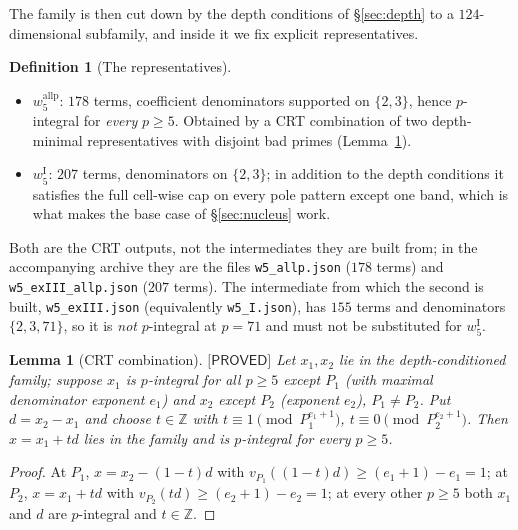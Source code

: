 \documentclass[11pt,reqno]{amsart}
\theoremstyle{plain}
\newtheorem{lemma}[theorem]{Lemma}
\theoremstyle{definition}
\newtheorem{definition}[theorem]{Definition}
\theoremstyle{remark}
\numberwithin{equation}{section}
\newcommand{\ZZ}{\mathbb{Z}}
\newcommand{\PROVED}{\textsf{[PROVED]}}
\begin{document}
The family is then cut down by the depth conditions of \S\ref{sec:depth} to a
$124$-dimensional subfamily, and inside it we fix explicit representatives.

\begin{definition}[The representatives]\label{def:reps}
\leavevmode
\begin{itemize}[leftmargin=1.6em]
\item $w_5^{\mathrm{allp}}$: $178$ terms, coefficient denominators supported on $\{2,3\}$,
  hence $p$-integral for \emph{every} $p\ge5$. Obtained by a CRT combination of two
  depth-minimal representatives with disjoint bad primes (Lemma~\ref{lem:CRT}).
\item $w_5^{\mathrm I}$: $207$ terms, denominators on $\{2,3\}$; in addition to the depth
  conditions it satisfies the full cell-wise cap on every pole pattern except one band, which
  is what makes the base case of \S\ref{sec:nucleus} work.
\end{itemize}
Both are the CRT outputs, not the intermediates they are built from; in the accompanying
archive they are the files \texttt{w5\_allp.json} ($178$ terms) and
\texttt{w5\_exIII\_allp.json} ($207$ terms). The intermediate from which the second is built,
\texttt{w5\_exIII.json} (equivalently \texttt{w5\_I.json}), has $155$ terms and denominators
$\{2,3,71\}$, so it is \emph{not} $p$-integral at $p=71$ and must not be substituted for
$w_5^{\mathrm I}$.
\end{definition}

\begin{lemma}[CRT combination]\label{lem:CRT}
$\PROVED$ Let $x_1,x_2$ lie in the depth-conditioned family; suppose $x_1$ is $p$-integral for
all $p\ge5$ except $P_1$ (with maximal denominator exponent $e_1$) and $x_2$ except $P_2$
(exponent $e_2$), $P_1\ne P_2$. Put $d=x_2-x_1$ and choose $t\in\ZZ$ with
$t\equiv1\pmod{P_1^{e_1+1}}$, $t\equiv0\pmod{P_2^{e_2+1}}$. Then $x=x_1+td$ lies in the family
and is $p$-integral for every $p\ge5$.
\end{lemma}

\begin{proof}
At $P_1$, $x=x_2-(1-t)d$ with $v_{P_1}((1-t)d)\ge(e_1+1)-e_1=1$; at $P_2$, $x=x_1+td$ with
$v_{P_2}(td)\ge(e_2+1)-e_2=1$; at every other $p\ge5$ both $x_1$ and $d$ are $p$-integral and
$t\in\ZZ$.
\end{proof}
\end{document}
